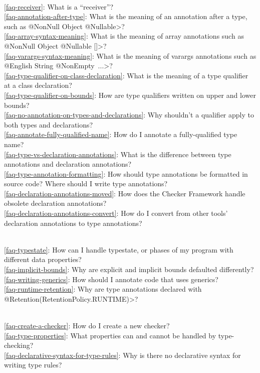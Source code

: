 \\ \ref{faq-receiver}: What is a ``receiver''?
\\ \ref{faq-annotation-after-type}: What is the meaning of an annotation after a type, such as \<@NonNull Object @Nullable>?
\\ \ref{faq-array-syntax-meaning}: What is the meaning of array annotations such as \<@NonNull Object @Nullable []>?
\\ \ref{faq-varargs-syntax-meaning}: What is the meaning of varargs annotations such as \<@English String @NonEmpty~...>?
\\ \ref{faq-type-qualifier-on-class-declaration}: What is the meaning of a type qualifier at a class declaration?
\\ \ref{faq-type-qualifier-on-bounds}: How are type qualifiers written on upper and lower bounds?
\\ \ref{faq-no-annotation-on-types-and-declarations}: Why shouldn't a qualifier apply to both types and declarations?
\\ \ref{faq-annotate-fully-qualified-name}: How do I annotate a
fully-qualified type name?
\\ \ref{faq-type-vs-declaration-annotations}: What is the difference between type annotations and declaration annotations?
\\ \ref{faq-type-annotation-formatting}: How should type annotations be formatted in source code?  Where should I write type annotations?
\\ \ref{faq-declaration-annotations-moved}: How does the Checker Framework handle obsolete declaration annotations?
\\ \ref{faq-declaration-annotations-convert}: How do I convert from other tools' declaration annotations to type annotations?

\\ \ref{faq-typestate}: How can I handle typestate, or phases of my program with different data properties?
\\ \ref{faq-implicit-bounds}: Why are explicit and implicit bounds defaulted differently?
\\ \ref{faq-writing-generics}: How should I annotate code that uses generics?
\\ \ref{faq-runtime-retention}: Why are type annotations declared with \<@Retention(RetentionPolicy.RUNTIME)>?

\\ \ref{faq-create-a-checker}: How do I create a new checker?
\\ \ref{faq-type-properties}: What properties can and cannot be handled by type-checking?
\\ \ref{faq-declarative-syntax-for-type-rules}: Why is there no declarative syntax for writing type rules?

